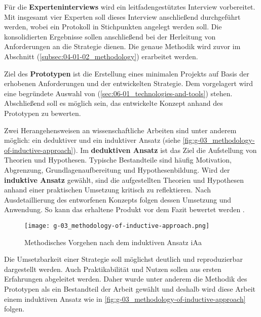 Für die \textbf{Experteninterviews} wird ein leitfadengestütztes Interview vorbereitet. Mit insgesamt vier Experten soll dieses Interview anschließend durchgeführt werden, wobei ein Protokoll in Stichpunkten angelegt werden soll. Die konsolidierten Ergebnisse sollen anschließend bei der Herleitung von Anforderungen an die  Strategie dienen. Die genaue Methodik wird zuvor im Abschnitt  (\autoref{subsec:04-01-02_methodology}) erarbeitet werden.

Ziel des \textbf{Prototypen} ist die Erstellung eines minimalen Projekts auf Basis der erhobenen Anforderungen und der entwickelten Strategie. Dem vorgelagert wird eine begründete Auswahl von  (\autoref{sec:06-01_technologies-and-tools}) stehen. Abschließend soll es möglich sein, das entwickelte Konzept anhand des Prototypen zu bewerten.

Zwei Herangehensweisen an wissenschaftliche Arbeiten sind unter anderem möglich: ein deduktiver und ein induktiver Ansatz (siehe \autoref{fig:g-03_methodology-of-inductive-approach}). Im \textbf{deduktiven Ansatz} ist das Ziel die Aufstellung von Theorien und Hypothesen. Typische Bestandteile sind häufig Motivation, Abgrenzung, Grundlagenaufbereitung und Hypothesenbildung. Wird der \textbf{induktive Ansatz} gewählt, sind die aufgestellten Theorien und Hypothesen anhand einer praktischen Umsetzung kritisch zu reflektieren. Nach Ausdetaillierung des entworfenen Konzepts folgen dessen Umsetzung und Anwendung. So kann das erhaltene Produkt vor dem Fazit bewertet werden \cite{400:Beitrag-Produktrepraesentation-fuer-Bedarfs-und-Kapazitaetsmanagement-digitalisierter-Fahrzeuge}.

\begin{figure}[h]
    \centering
    \texttt{[image: g-03\_methodology-of-inductive-approach.png]}
    \caption{Methodisches Vorgehen nach dem induktiven Ansatz \acrshort{iAa} \citeauthor{400:Beitrag-Produktrepraesentation-fuer-Bedarfs-und-Kapazitaetsmanagement-digitalisierter-Fahrzeuge}}
    \label{fig:g-03_methodology-of-inductive-approach}
\end{figure}

Die Umsetzbarkeit einer  Strategie soll möglichst deutlich und reproduzierbar dargestellt werden. Auch Praktikabilität und Nutzen sollen aus ersten Erfahrungen abgeleitet werden. Daher wurde unter anderem die Methodik des Prototypen als ein Bestandteil der Arbeit gewählt und deshalb wird diese Arbeit einem induktiven Ansatz wie in \autoref{fig:g-03_methodology-of-inductive-approach} folgen.

